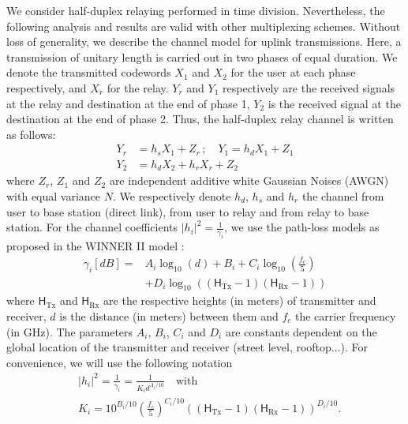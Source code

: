 \documentclass[journal]{IEEEtran}
\theoremstyle{definition}
\begin{document}
We consider half-duplex relaying performed in time division.
Nevertheless, the following analysis and results are valid with other multiplexing schemes. Without loss of generality, we describe the channel model for uplink transmissions.
Here, a transmission of unitary length is carried out in two phases of equal duration. We denote the transmitted codewords $X_{1}$ and $X_{2}$ for the user at each phase respectively, and $X_r$ for the relay. $Y_r$ and $Y_1$ respectively are the received signals at the relay and destination at the end of phase 1, $Y_2$ is the received signal at the destination at the end of phase 2. Thus, the half-duplex relay channel is written as follows:
\begin{equation}
\begin{split}
Y_r & = h_s X_1 + Z_r \, ; \quad
Y_1 = h_d X_1 + Z_1  \\ Y_2 &= h_d X_2 + h_r X_r + Z_2 
\end{split}
\end{equation}
where $Z_r$, $Z_1$ and $Z_2$ are independent additive white Gaussian Noises (AWGN) with equal variance $N$. We respectively denote $h_d$, $h_s$ and $h_r$ the channel from user to base station (direct link), from user to relay and from relay to base station.  For the channel coefficients $\vert h_{i} \vert^2 = \frac{1}{\gamma_{i}}$, we use the path-loss models as proposed in the WINNER II model \cite{winner}: 
\begin{equation}
\begin{split}
\gamma_{i}[dB] = & A_{i} \log_{10}(d) + B_{i} + C_{i} \log_{10} \left(\frac{f_c}{5} \right) 
 \\ &
 + D_{i} \log_{10}\left((\mathsf{H}_\text{Tx}-1)(\mathsf{H}_\text{Rx}-1)\right)
 \end{split}
\label{eq:pathloss}
\end{equation}
where $\mathsf{H}_\text{Tx}$ and $\mathsf{H}_\text{Rx}$ are the respective heights (in meters) of transmitter and receiver, $d$ is the distance (in meters) between them and $f_c$ the carrier frequency (in GHz). The parameters $A_{i}$, $B_{i}$, $C_{i}$ and $D_{i}$ are constants dependent on the global location of the transmitter and receiver (street level, rooftop...).
For convenience, we will use the following notation
\begin{align}
& \vert h_{i} \vert^2 = \frac{1}{\gamma_{i}} = \frac{1}{K_{i} d^{A_{i} /10}} \quad \text{with} 
\label{eq:Ki} \\ & 
K_{i} = 10^{B_{i}/10}\left(\frac{f_c}{5}\right)^{C_{i} /10} \left((\mathsf{H}_\text{Tx}-1)(\mathsf{H}_\text{Rx}-1)\right)^{D_{i}/10} .
\nonumber
\end{align}
\end{document}
